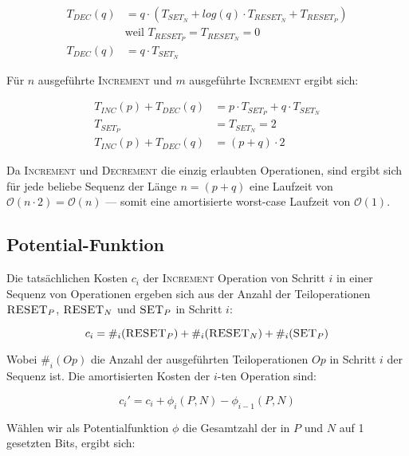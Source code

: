 \documentclass[parskip=half,a4paper]{scrartcl}
\begin{document}
\begin{equation}
\begin{aligned}
T_{DEC}(q) &= q \cdot (T_{SET_N} + log(q) \cdot T_{RESET_N} + T_{RESET_P}) \\
& \text{weil  $T_{RESET_P} = T_{RESET_N} = 0$} \\
T_{DEC}(q)  &= q \cdot T_{SET_N}
\end{aligned}
\end{equation}

Für $n$ ausgeführte \textsc{Increment} und $m$ ausgeführte \textsc{Increment} ergibt sich:

\begin{equation}
\begin{aligned}
T_{INC}(p) + T_{DEC}(q) &= p \cdot T_{SET_P} + q \cdot T_{SET_N}\\
T_{SET_P} &= T_{SET_N} = 2 \\
T_{INC}(p) + T_{DEC}(q) &= (p+q) \cdot 2
\end{aligned}
\end{equation}

Da \textsc{Increment} und \textsc{Decrement} die einzig erlaubten Operationen, sind ergibt sich für jede beliebe Sequenz der Länge $n = (p+q)$ eine Laufzeit von $\mathcal{O}(n\cdot 2) = \mathcal{O}(n)$ --- somit eine amortisierte worst-case Laufzeit von $\mathcal{O}(1)$.

\subsection*{Potential-Funktion}

Die tatsächlichen Kosten $c_i$ der \textsc{Increment} Operation von Schritt $i$ in einer Sequenz von Operationen ergeben sich aus der Anzahl der Teiloperationen $\textsc{RESET}_P$, $\textsc{RESET}_N$ und $\textsc{SET}_P$ in Schritt $i$:

\begin{equation}
c_i = \#_i(\textsc{RESET}_P) + \#_i(\textsc{RESET}_N) + \#_i(\textsc{SET}_P)
\end{equation}

Wobei $\#_i(\textit{Op})$ die Anzahl der ausgeführten Teiloperationen $\textit{Op}$ in Schritt $i$ der Sequenz ist. Die amortisierten Kosten der $i$-ten Operation sind:

\begin{equation}
c_i' = c_i + \phi_i(P,N) - \phi_{i-1}(P,N)
\end{equation}

Wählen wir als Potentialfunktion $\phi$ die Gesamtzahl der in $P$ und $N$ auf 1 gesetzten Bits, ergibt sich:
\end{document}
